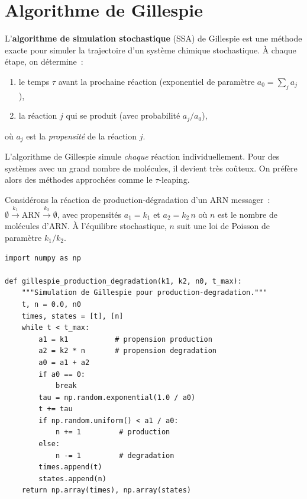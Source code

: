 \section{Algorithme de Gillespie}
\label{sec:gillespie}

\begin{definition}
L'\textbf{algorithme de simulation stochastique} (SSA) de Gillespie
est une m\'ethode exacte pour simuler la trajectoire d'un syst\`eme
chimique stochastique. \`A chaque \'etape, on d\'etermine~:
\begin{enumerate}
  \item le temps $\tau$ avant la prochaine r\'eaction (exponentiel
    de param\`etre $a_0 = \sum_j a_j$),
  \item la r\'eaction $j$ qui se produit (avec probabilit\'e $a_j / a_0$),
\end{enumerate}
o\`u $a_j$ est la \emph{propensit\'e} de la r\'eaction $j$.
\end{definition}

\begin{attention}
L'algorithme de Gillespie simule \emph{chaque} r\'eaction individuellement.
Pour des syst\`emes avec un grand nombre de mol\'ecules, il devient
tr\`es co\^uteux. On pr\'ef\`ere alors des m\'ethodes approch\'ees comme
le $\tau$-leaping.
\end{attention}

\begin{exemple}
Consid\'erons la r\'eaction de production-d\'egradation d'un ARN messager~:
$\emptyset \xrightarrow{k_1} \text{ARN} \xrightarrow{k_2} \emptyset$,
avec propensit\'es $a_1 = k_1$ et $a_2 = k_2\, n$ o\`u $n$ est le
nombre de mol\'ecules d'ARN. \`A l'\'equilibre stochastique, $n$ suit
une loi de Poisson de param\`etre $k_1/k_2$.
\end{exemple}

\begin{verbatim}
import numpy as np

def gillespie_production_degradation(k1, k2, n0, t_max):
    """Simulation de Gillespie pour production-degradation."""
    t, n = 0.0, n0
    times, states = [t], [n]
    while t < t_max:
        a1 = k1           # propension production
        a2 = k2 * n       # propension degradation
        a0 = a1 + a2
        if a0 == 0:
            break
        tau = np.random.exponential(1.0 / a0)
        t += tau
        if np.random.uniform() < a1 / a0:
            n += 1         # production
        else:
            n -= 1         # degradation
        times.append(t)
        states.append(n)
    return np.array(times), np.array(states)
\end{verbatim}


